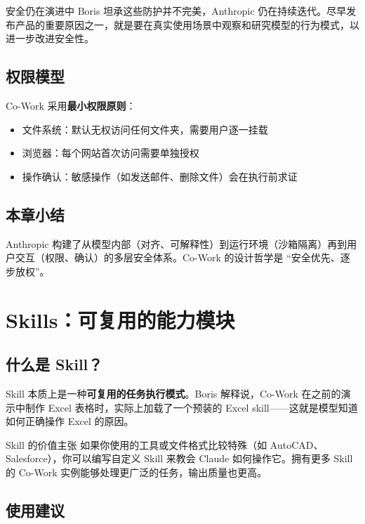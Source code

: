 \documentclass[a4paper]{article}
\begin{document}
\begin{warningbox}{安全仍在演进中}
Boris 坦承这些防护并不完美，Anthropic 仍在持续迭代。尽早发布产品的重要原因之一，就是要在真实使用场景中观察和研究模型的行为模式，以进一步改进安全性。
\end{warningbox}

\subsection{权限模型}

Co-Work 采用\textbf{最小权限原则}：

\begin{itemize}
    \item 文件系统：默认无权访问任何文件夹，需要用户逐一挂载
    \item 浏览器：每个网站首次访问需要单独授权
    \item 操作确认：敏感操作（如发送邮件、删除文件）会在执行前求证
\end{itemize}

\subsection{本章小结}

Anthropic 构建了从模型内部（对齐、可解释性）到运行环境（沙箱隔离）再到用户交互（权限、确认）的多层安全体系。Co-Work 的设计哲学是 ``安全优先、逐步放权''。

\section{Skills：可复用的能力模块}

\subsection{什么是 Skill？}

Skill 本质上是一种\textbf{可复用的任务执行模式}。Boris 解释说，Co-Work 在之前的演示中制作 Excel 表格时，实际上加载了一个预装的 Excel skill——这就是模型知道如何正确操作 Excel 的原因。

\begin{importantbox}{Skill 的价值主张}
如果你使用的工具或文件格式比较特殊（如 AutoCAD、Salesforce），你可以编写自定义 Skill 来教会 Claude 如何操作它。拥有更多 Skill 的 Co-Work 实例能够处理更广泛的任务，输出质量也更高。
\end{importantbox}

\subsection{使用建议}
\end{document}
